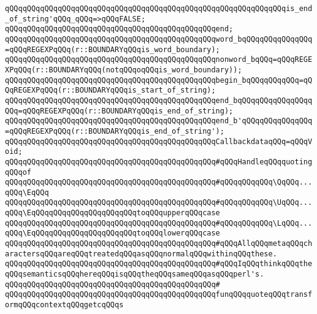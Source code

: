 \verb|qQQqqQQqqQQqqQQqqQQqqQQqqQQqqQQqqQQqqQQqqQQqqQQqqQQqqQQqqQQqqQQqis_end_of_string'qQQq_qQQq=>qQQqFALSE;|\newline
\verb|qQQqqQQqqQQqqQQqqQQqqQQqqQQqqQQqqQQqqQQqqQQqqQQqend;|\newline
\newline
\verb|qQQqqQQqqQQqqQQqqQQqqQQqqQQqqQQqqQQqqQQqqQQqqQQqword_bqQQqqQQqqQQqqQQq=qQQqREGEXPqQQq(r::BOUNDARYqQQqis_word_boundary);|\newline
\verb|qQQqqQQqqQQqqQQqqQQqqQQqqQQqqQQqqQQqqQQqqQQqqQQqnonword_bqQQq=qQQqREGEXPqQQq(r::BOUNDARYqQQq(notqQQqoqQQqis_word_boundary));|\newline
\verb|qQQqqQQqqQQqqQQqqQQqqQQqqQQqqQQqqQQqqQQqqQQqqQQqbegin_bqQQqqQQqqQQq=qQQqREGEXPqQQq(r::BOUNDARYqQQqis_start_of_string);|\newline
\verb|qQQqqQQqqQQqqQQqqQQqqQQqqQQqqQQqqQQqqQQqqQQqqQQqend_bqQQqqQQqqQQqqQQqqQQq=qQQqREGEXPqQQq(r::BOUNDARYqQQqis_end_of_string);|\newline
\verb|qQQqqQQqqQQqqQQqqQQqqQQqqQQqqQQqqQQqqQQqqQQqqQQqend_b'qQQqqQQqqQQqqQQq=qQQqREGEXPqQQq(r::BOUNDARYqQQqis_end_of_string');|\newline
\newline
\verb|qQQqqQQqqQQqqQQqqQQqqQQqqQQqqQQqqQQqqQQqqQQqqQQqCallbackdataqQQq=qQQqVoid;|\newline
\newline
\verb|qQQqqQQqqQQqqQQqqQQqqQQqqQQqqQQqqQQqqQQqqQQqqQQq#qQQqHandleqQQqquotingqQQqof|\newline
\verb|qQQqqQQqqQQqqQQqqQQqqQQqqQQqqQQqqQQqqQQqqQQqqQQq#qQQqqQQqqQQq\QqQQq...qQQq\EqQQq|\newline
\verb|qQQqqQQqqQQqqQQqqQQqqQQqqQQqqQQqqQQqqQQqqQQqqQQq#qQQqqQQqqQQq\UqQQq...qQQq\EqQQqqQQqqQQqqQQqqQQqqQQqtoqQQqupperqQQqcase|\newline
\verb|qQQqqQQqqQQqqQQqqQQqqQQqqQQqqQQqqQQqqQQqqQQqqQQq#qQQqqQQqqQQq\LqQQq...qQQq\EqQQqqQQqqQQqqQQqqQQqqQQqtoqQQqlowerqQQqcase|\newline
\verb|qQQqqQQqqQQqqQQqqQQqqQQqqQQqqQQqqQQqqQQqqQQqqQQq#qQQqAllqQQqmetaqQQqcharactersqQQqareqQQqtreatedqQQqasqQQqnormalqQQqwithinqQQqthese.|\newline
\verb|qQQqqQQqqQQqqQQqqQQqqQQqqQQqqQQqqQQqqQQqqQQqqQQq#qQQqIqQQqthinkqQQqtheqQQqsemanticsqQQqhereqQQqisqQQqtheqQQqsameqQQqasqQQqperl's.|\newline
\verb|qQQqqQQqqQQqqQQqqQQqqQQqqQQqqQQqqQQqqQQqqQQqqQQq#|\newline
\verb|qQQqqQQqqQQqqQQqqQQqqQQqqQQqqQQqqQQqqQQqqQQqqQQqfunqQQqquoteqQQqtransformqQQqcontextqQQqgetcqQQqs|\newline
